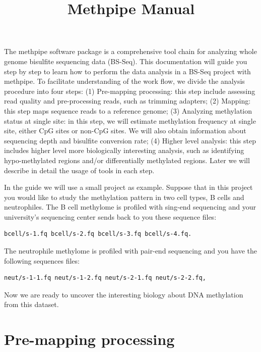 \documentclass{article}
\title{Methpipe Manual}
\begin{document}
\maketitle
The methpipe software package is a comprehensive tool chain for
analyzing whole genome bisulfite sequencing data (BS-Seq).  This
documentation will guide you step by step to learn how to perform the
data analysis in a BS-Seq project with methpipe. To facilitate
understanding of the work flow, we divide the analysis procedure into
four steps: (1) Pre-mapping processing: this step include assessing
read quality and pre-processing reads, such as trimming adapters; (2)
Mapping: this step maps sequence reads to a reference genome; (3)
Analyzing methylation status at single site: in this step, we will
estimate methylation frequency at single site, either CpG sites or
non-CpG sites. We will also obtain information about sequencing depth
and bisulfite conversion rate; (4) Higher level analysis: this step
includes higher level more biologically interesting analysis, such as
identifying hypo-methylated regions and/or differentially methylated
regions. Later we will describe in detail the usage of tools in each
step.

In the guide we will use a small project as example. Suppose that in
this project you would like to study the methylation pattern in two
cell types, B cells and neutrophiles. The B cell methylome is profiled
with sing-end sequencing and your university's sequencing center sends
back to you these sequence files:
\begin{verbatim}
bcell/s-1.fq bcell/s-2.fq bcell/s-3.fq bcell/s-4.fq.
\end{verbatim}
The neutrophile methylome is profiled with pair-end sequencing and you
have the following sequences files:
\begin{verbatim}
neut/s-1-1.fq neut/s-1-2.fq neut/s-2-1.fq neut/s-2-2.fq,
\end{verbatim}
Now we are ready to uncover the interesting biology about DNA
methylation from this dataset. 

\section{Pre-mapping processing}
\label{sec:premapping}
\end{document}
